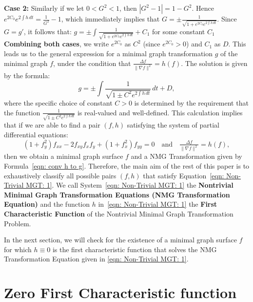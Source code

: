 \documentclass[12pt]{article}
\theoremstyle{plain}
\theoremstyle{definition}
\theoremstyle{remark}
\begin{document}
   \textbf{Case 2:} Similarly if we let \(0<G^2<1\), then \( |G^2 - 1| = 1-G^2\). Hence \( e^{2C_0}e^{2\int h\, dt} = \tfrac{1}{G^2}-1\), which immediately implies that \( G = \pm \frac{1}{\sqrt{1 +e^{2C_0} e^{2\int h\, dt}}}\). Since \(G = g\prime\), it follows that: \( g = \pm \int \frac{1}{\sqrt{1 + e^{2C_0}e^{2\int h\, dt}}}+C_1\) for some constant \(C_1\)\\
   \textbf{Combining both cases}, we write \(e^{2C_0}\) as \(C^2\) (since \(e^{2C_0} > 0\)) and \(C_1\) as \(D\). This leads us to the general expression for a minimal graph transformation \(g\) of the minimal graph \(f\), under the condition that \(\tfrac{\Delta f}{\|\nabla f\|^2} = h(f)\). The solution is given by the formula:
   \begin{equation}
   	\label{eqn: conv h to g}
   	\boxed{ g = \pm \int \frac{1}{\sqrt{1 \pm C^2e^{2\int h\, dt}}}\, dt + D},
   \end{equation}
   where the specific choice of constant \(C>0\) is determined by the requirement that the function \(\frac{1}{\sqrt{1 \pm C^2e^{2\int h\, dt}}}\) is real-valued and well-defined.  This calculation implies that if we are able to find a pair \((f,h)\) satisfying the system of partial differential equations:
   \begin{equation}
   	\label{eqn: Non-Trivial MGT: 1}
   	\boxed{(1 + f_y^2) f_{xx} - 2 f_{xy} f_x f_y + (1 + f_x^2) f_{yy} = 0}\quad \text{and} \quad  \boxed{\tfrac{\Delta f}{\|\nabla f\|^2} = h(f)},
   \end{equation}
   then we obtain a minimal graph surface \(f\) and a NMG Transformation given by Formula~\ref{eqn: conv h to g}. Therefore, the main aim of the rest of this paper is to exhaustively classify all possible pairs \((f,h)\) that satisfy Equation~\ref{eqn: Non-Trivial MGT: 1}. We call System~\ref{eqn: Non-Trivial MGT: 1} the \textbf{Nontrivial Minimal Graph Transformation Equations (NMG Transformation Equation)} and the function \(h\) in~\ref{eqn: Non-Trivial MGT: 1} the \textbf{First Characteristic Function} of the Nontrivial Minimal Graph Transformation Problem.
   
   In the next section, we will check for the existence of a minimal graph surface \(f\) for which \(h\equiv0\) is the first characteristic function that solves the NMG Transformation Equation given in \ref{eqn: Non-Trivial MGT: 1}.


   \section{Zero First Characteristic function} \label{section: h=0}
\end{document}
